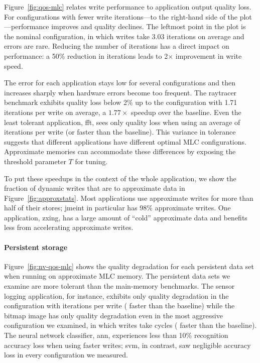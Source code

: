 \documentclass[prodmode,acmtocs]{acmsmall}
\begin{document}
Figure~\ref{fig:qos-mlc} relates write performance to application output
quality loss.
For configurations with fewer write iterations---to the
right-hand side of the plot---performance improves and quality declines. The
leftmost point in the plot is the nominal configuration, in which writes take
3.03 iterations on average and errors are rare. Reducing the number
of iterations has a direct impact on performance: a 50\% reduction in
iterations leads to 2$\times$ improvement in write speed.

The error for each application stays low for several configurations and then
increases sharply when hardware errors become too frequent.
The \textsf{raytracer} benchmark exhibits quality loss below 2\% up to the
configuration with 1.71 iterations per write on average, a $1.77\times$ speedup over the
baseline. Even the least tolerant application, \textsf{fft}, sees only
quality loss when using an average of  iterations per write (or
 faster than the baseline).
This variance in tolerance suggests that
different applications have different optimal MLC configurations. Approximate
memories can accommodate these differences by exposing the threshold parameter $T$
for tuning.

To put these speedups in the context of the whole application, we
show the fraction of
dynamic writes that are to approximate data in
Figure~\ref{fig:approxstats}.
Most applications use approximate writes for
more than half of their stores; \textsf{jmeint} in particular has 98\%
approximate writes. One application, \textsf{zxing}, has a large amount of
``cold'' approximate data and benefits less from accelerating
approximate writes.


\paragraph{Persistent storage}

Figure~\ref{fig:nv-qos-mlc} shows the quality degradation for each
persistent data set when running on approximate MLC memory. The
persistent data sets we examine are more tolerant than the
main-memory benchmarks. The sensor logging application, for instance,
exhibits only  quality degradation in the
configuration with 
iterations per write ( faster than the baseline) while the bitmap
image has only  quality degradation even in the most aggressive
configuration we examined, in which writes take
 cycles (
faster than the baseline).
The neural network classifier, \textsf{ann}, experiences less than 10\%
recognition accuracy loss when using  faster
writes; \textsf{svm}, in contrast, saw negligible accuracy loss in every
configuration we measured.
\end{document}
